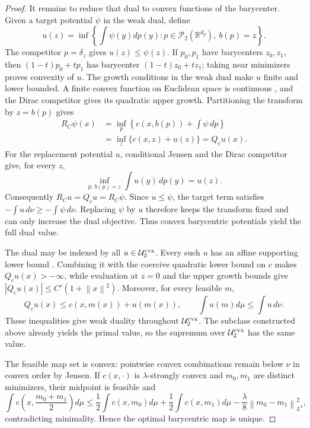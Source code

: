 \documentclass[11pt]{article}
\newcommand{\R}{\mathbb R}
\newcommand{\cP}{\mathcal P}
\newcommand{\norm}[1]{\left\lVert #1\right\rVert}
\theoremstyle{plain}
\theoremstyle{definition}
\theoremstyle{remark}
\begin{document}
\begin{proof}
It remains to reduce that dual to convex functions of the barycenter.  Given a
target potential $\psi$ in the weak dual, define
\[
 u(z)=\inf\left\{\int\psi(y)dp(y):p\in\cP_2(\R^{d_y}),\ b(p)=z\right\}.
\]
The competitor $p=\delta_z$ gives $u(z)\le\psi(z)$.  If $p_0,p_1$ have
barycenters $z_0,z_1$, then $(1-t)p_0+tp_1$ has barycenter
$(1-t)z_0+tz_1$; taking near minimizers proves convexity of $u$.  The growth
conditions in the weak dual make $u$ finite and lower bounded.  A finite convex
function on Euclidean space is continuous
\cite[Corollary~10.1.1]{Rockafellar}, and the Dirac competitor gives its
quadratic upper growth.  Partitioning the transform by $z=b(p)$ gives
\begin{align*}
 R_C\psi(x)
 &=\inf_{p}\left\{c(x,b(p))+\int\psi\,dp\right\}\\
 &=\inf_z\{c(x,z)+u(z)\}=Q_cu(x).
\end{align*}
For the replacement potential $u$, conditional Jensen and the Dirac competitor
give, for every $z$,
\[
 \inf_{p:\,b(p)=z}\int u(y)\,dp(y)=u(z).
\]
Consequently $R_Cu=Q_cu=R_C\psi$.  Since $u\le\psi$, the target term satisfies
$-\int u\,d\nu\ge-\int\psi\,d\nu$.  Replacing $\psi$ by $u$ therefore keeps the
transform fixed and can only increase the dual objective.  Thus convex barycentric
potentials yield the full dual value.

The dual may be indexed by all $u\in\mathcal U_2^{\rm cvx}$.  Every such $u$ has
an affine supporting lower bound
\cite[Corollary~12.1.2]{Rockafellar}.  Combining it with the coercive
quadratic lower bound on $c$ makes $Q_cu(x)>-\infty$, while evaluation at $z=0$
and the upper growth bounds give $|Q_cu(x)|\le C'(1+\norm x^2)$.  Moreover, for
every feasible $m$,
\[
 Q_cu(x)\le c(x,m(x))+u(m(x)),\qquad
 \int u(m)d\mu\le\int u\,d\nu.
\]
These inequalities give weak duality throughout $\mathcal U_2^{\rm cvx}$.  The
subclass constructed above already yields the primal value, so the supremum over
$\mathcal U_2^{\rm cvx}$ has the same value.

The feasible map set is convex: pointwise convex combinations remain below $\nu$
in convex order by Jensen.  If $c(x,\cdot)$ is $\lambda$-strongly convex and
$m_0,m_1$ are distinct minimizers, their midpoint is feasible and
\[
 \int c\left(x,\frac{m_0+m_1}{2}\right)d\mu
 \le\frac12\int c(x,m_0)d\mu+\frac12\int c(x,m_1)d\mu
 -\frac{\lambda}{8}\norm{m_0-m_1}_{L^2}^2,
\]
contradicting minimality.  Hence the optimal barycentric map is unique.
\end{proof}
\end{document}

